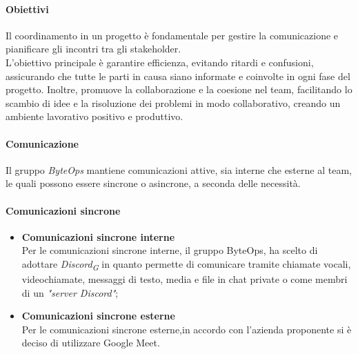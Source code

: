 \paragraph{Obiettivi}
Il coordinamento in un progetto è fondamentale per gestire la comunicazione e pianificare gli incontri tra gli stakeholder. \\
L'obiettivo principale è garantire efficienza, evitando ritardi e confusioni, assicurando che tutte le parti in causa siano informate e coinvolte in ogni fase del progetto. Inoltre, promuove la collaborazione e la coesione nel team, facilitando lo scambio di idee e la risoluzione dei problemi in modo collaborativo, creando un ambiente lavorativo positivo e produttivo.

\paragraph*{Comunicazione}
Il gruppo \textit{ByteOps} mantiene comunicazioni attive, sia interne che esterne al team, le quali possono essere sincrone o asincrone, a seconda delle necessità.

\paragraph{Comunicazioni sincrone}
\begin{itemize}
  \item \textbf{Comunicazioni sincrone interne} \\
  Per le comunicazioni sincrone interne, il gruppo ByteOps, ha scelto di adottare \textit{Discord}\textsubscript{\textit{G}} in quanto permette di comunicare tramite chiamate vocali, videochiamate, messaggi di testo, media e file in chat private o come membri di un \textit{"server Discord"};

  \item \textbf{Comunicazioni sincrone esterne} \\
  Per le comunicazioni sincrone esterne,in accordo con l'azienda proponente si è deciso di utilizzare Google Meet.
\end{itemize}

